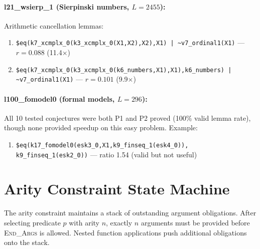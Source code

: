 \documentclass{article}
\begin{document}
\paragraph{l21\_wsierp\_1 (Sierpinski numbers, $L{=}2455$):}
Arithmetic cancellation lemmas:
\begin{enumerate}
\item \texttt{\$eq(k7\_xcmplx\_0(k3\_xcmplx\_0(X1,X2),X2),X1) |
      \~{}v7\_ordinal1(X1)} --- $r{=}0.088$ (11.4$\times$)
\item \texttt{\$eq(k7\_xcmplx\_0(k3\_xcmplx\_0(k6\_numbers,X1),X1),k6\_numbers) |
      \~{}v7\_ordinal1(X1)} --- $r{=}0.101$ (9.9$\times$)
\end{enumerate}

\paragraph{l100\_fomodel0 (formal models, $L{=}296$):}
All 10 tested conjectures were both P1 and P2 proved (100\% valid lemma rate),
though none provided speedup on this easy problem. Example:
\begin{enumerate}
\item \texttt{\$eq(k17\_fomodel0(esk3\_0,X1,k9\_finseq\_1(esk4\_0)),
      k9\_finseq\_1(esk2\_0))} --- ratio 1.54 (valid but not useful)
\end{enumerate}

\section{Arity Constraint State Machine}
\label{app:arity}

The arity constraint maintains a stack of outstanding argument obligations.
After selecting predicate $p$ with arity $n$, exactly $n$ arguments must be
provided before \textsc{End\_Args} is allowed. Nested function applications
push additional obligations onto the stack.
\end{document}
